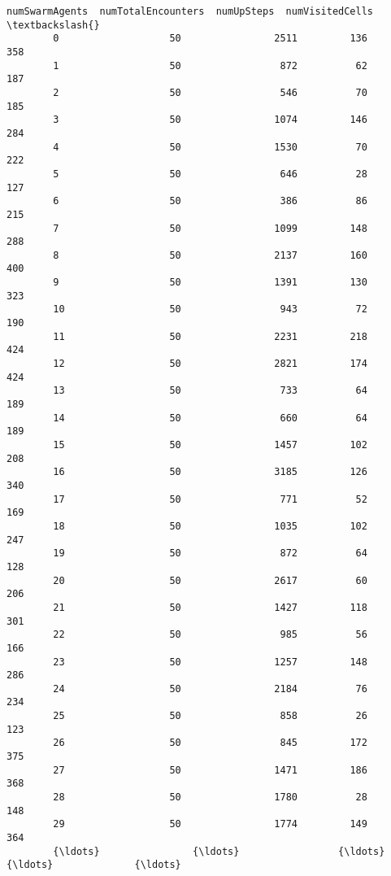 \documentclass[11pt]{article}
\begin{document}
\begin{Verbatim}[commandchars=\\\{\}]
                numSwarmAgents  numTotalEncounters  numUpSteps  numVisitedCells  \textbackslash{}
        0                   50                2511         136              358   
        1                   50                 872          62              187   
        2                   50                 546          70              185   
        3                   50                1074         146              284   
        4                   50                1530          70              222   
        5                   50                 646          28              127   
        6                   50                 386          86              215   
        7                   50                1099         148              288   
        8                   50                2137         160              400   
        9                   50                1391         130              323   
        10                  50                 943          72              190   
        11                  50                2231         218              424   
        12                  50                2821         174              424   
        13                  50                 733          64              189   
        14                  50                 660          64              189   
        15                  50                1457         102              208   
        16                  50                3185         126              340   
        17                  50                 771          52              169   
        18                  50                1035         102              247   
        19                  50                 872          64              128   
        20                  50                2617          60              206   
        21                  50                1427         118              301   
        22                  50                 985          56              166   
        23                  50                1257         148              286   
        24                  50                2184          76              234   
        25                  50                 858          26              123   
        26                  50                 845         172              375   
        27                  50                1471         186              368   
        28                  50                1780          28              148   
        29                  50                1774         149              364   
        {\ldots}                {\ldots}                 {\ldots}         {\ldots}              {\ldots}   

\end{Verbatim}
\end{document}
